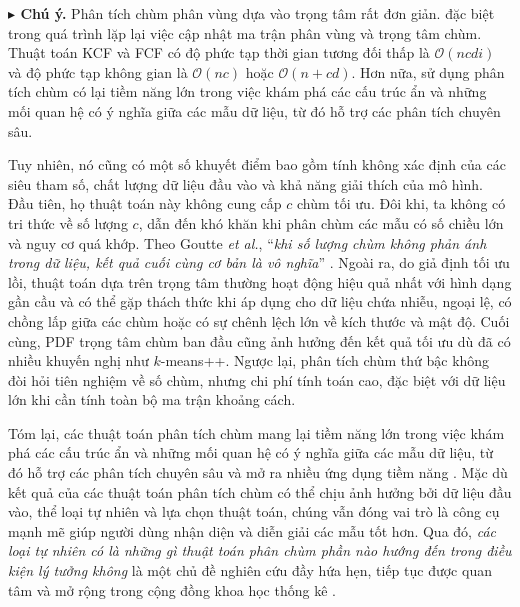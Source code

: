 \documentclass[a4paper,oneside]{book} %
\theoremstyle{plain}
\theoremstyle{plain}
\theoremstyle{nonumberplain}
\begin{document}
\textbf{$\blacktriangleright$ Chú ý.}
Phân tích chùm phân vùng dựa vào trọng tâm rất đơn giản. đặc biệt trong quá trình lặp lại việc cập nhật ma trận phân vùng và trọng tâm chùm. Thuật toán KCF và FCF có độ phức tạp thời gian tương đối thấp là $\mathcal O(ncdi)$ và độ phức tạp không gian là $\mathcal  O(nc)$ hoặc $\mathcal  O(n+cd)$. Hơn nữa, sử dụng phân tích chùm có lại tiềm năng lớn trong việc khám phá các cấu trúc ẩn và những mối quan hệ có ý nghĩa giữa các mẫu dữ liệu, từ đó hỗ trợ các phân tích chuyên sâu.


Tuy nhiên, nó cũng có một số khuyết điểm bao gồm tính không xác định của các siêu tham số,  chất lượng dữ liệu đầu vào và khả năng giải thích của mô hình. Đầu tiên, họ thuật toán này không cung cấp $c$ chùm tối ưu. Đôi khi, ta không có tri thức về số lượng $c$, dẫn đến khó khăn khi phân chùm các mẫu có số chiều lớn \cite{schubert2023stop} và nguy cơ quá khớp. Theo Goutte \textit{et al.}, ``\emph{khi số lượng chùm không phản ánh trong dữ liệu, kết quả cuối cùng cơ bản là vô nghĩa}'' \cite{goutte1999clustering}.  Ngoài ra, do giả định tối ưu lồi, thuật toán dựa trên trọng tâm thường hoạt động hiệu quả nhất với hình dạng gần cầu và có thể gặp thách thức khi áp dụng cho dữ liệu chứa nhiễu, ngoại lệ, có chồng lấp giữa các chùm hoặc có sự chênh lệch lớn về kích thước và mật độ. Cuối cùng, PDF trọng tâm chùm ban đầu cũng ảnh hưởng đến kết quả tối ưu dù đã có nhiều khuyến nghị như $k$-means++. 
Ngược lại, phân tích chùm thứ bậc không đòi hỏi tiên nghiệm về số chùm, nhưng chi phí tính toán cao, đặc biệt với dữ liệu lớn khi cần tính toàn bộ ma trận khoảng cách.


Tóm lại, các thuật toán phân tích chùm mang lại tiềm năng lớn trong việc khám phá các cấu trúc ẩn và những mối quan hệ có ý nghĩa giữa các mẫu dữ liệu, từ đó hỗ trợ các phân tích chuyên sâu và mở ra nhiều ứng dụng tiềm năng \cite{nguyen2024new,nguyentrang2017fuzzy}. Mặc dù kết quả của các thuật toán phân tích chùm có thể chịu ảnh hưởng bởi dữ liệu đầu vào, thể loại tự nhiên và lựa chọn thuật toán, chúng vẫn đóng vai trò là công cụ mạnh mẽ giúp người dùng nhận diện và diễn giải các mẫu tốt hơn. Qua đó, \emph{các loại tự nhiên có là những gì thuật toán phân chùm phần nào hướng đến trong điều kiện lý tưởng không} là một chủ đề nghiên cứu đầy hứa hẹn, tiếp tục được quan tâm và mở rộng trong cộng đồng khoa học thống kê \cite{leonelli2019data,watson2023philosophy,watson2023reply,mollema2024responding}.
\end{document}
